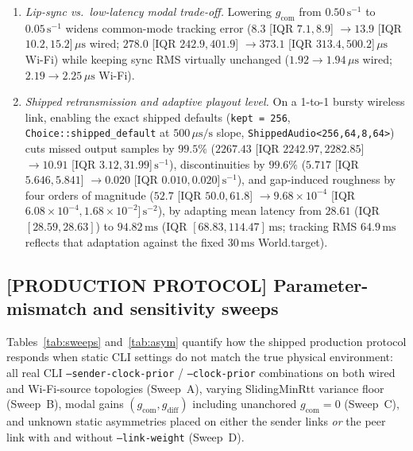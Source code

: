 \documentclass[11pt,a4paper]{article}
\DeclareRobustCommand{\lean}[1]{{\ttfamily\def\_{\textunderscore\allowbreak}#1}}
\theoremstyle{definition}
\begin{document}
\begin{enumerate}
  $7.72, 17.59$]\,$\mu\text{s}$), peak spread by $4.1\times$ ($154.6$ [IQR
  $143.5, 161.9$] $\to 37.4$ [IQR $30.2, 60.4$]\,$\mu\text{s}$), and tracking
  error by $2.7\times$ ($43.4$ [IQR $37.9, 49.7$] $\to 16.2$ [IQR
  $11.6, 19.6$]\,$\mu\text{s}$), while roughness and pause-induced misses stay
  comparable across both policies.
\item \emph{Lip-sync vs.\ low-latency modal trade-off.} Lowering
  $g_{\mathrm{com}}$ from $0.50\,\text{s}^{-1}$ to $0.05\,\text{s}^{-1}$ widens
  common-mode tracking error ($8.3$ [IQR $7.1, 8.9$] $\to 13.9$ [IQR
  $10.2, 15.2$]\,$\mu\text{s}$ wired; $278.0$ [IQR $242.9, 401.9$] $\to 373.1$
  [IQR $313.4, 500.2$]\,$\mu\text{s}$ Wi-Fi) while keeping sync RMS virtually
  unchanged ($1.92 \to 1.94\,\mu\text{s}$ wired; $2.19 \to 2.25\,\mu\text{s}$
  Wi-Fi).
\item \emph{Shipped retransmission and adaptive playout level.} On a 1-to-1
  bursty wireless link, enabling the exact shipped defaults
  (\texttt{kept = 256}, \texttt{Choice::shipped\_default} at
  $500\,\mu\text{s/s}$ slope, \texttt{ShippedAudio<256,64,8,64>}) cuts missed
  output samples by $99.5\%$ ($2267.43$ [IQR $2242.97, 2282.85$] $\to 10.91$
  [IQR $3.12, 31.99$]\,$\text{s}^{-1}$), discontinuities by $99.6\%$ ($5.717$
  [IQR $5.646, 5.841$] $\to 0.020$ [IQR $0.010, 0.020$]\,$\text{s}^{-1}$), and
  gap-induced roughness by four orders of magnitude ($52.7$ [IQR $50.0, 61.8$]
  $\to 9.68{\times}10^{-4}$ [IQR $6.08{\times}10^{-4}, 1.68{\times}10^{-2}$]\,$\text{s}^{-2}$),
  by adapting mean latency from $28.61$ (IQR $[28.59, 28.63]$) to $94.82\,\text{ms}$
  (IQR $[68.83, 114.47]\,\text{ms}$; tracking RMS $64.9\,\text{ms}$ reflects
  that adaptation against the fixed $30\,\text{ms}$ \lean{World.target}).
\end{enumerate}

\subsection{[PRODUCTION PROTOCOL] Parameter-mismatch and sensitivity sweeps}
\label{sec:sim-sweeps}

Tables~\ref{tab:sweeps} and~\ref{tab:asym} quantify how the shipped production
protocol responds when static CLI settings do not match the true physical
environment: all real CLI \texttt{--sender-clock-prior} /
\texttt{--clock-prior} combinations on both wired and Wi-Fi-source topologies
(Sweep~A), varying \lean{SlidingMinRtt} variance floor (Sweep~B), modal gains
$(g_{\mathrm{com}}, g_{\mathrm{diff}})$ including unanchored
$g_{\mathrm{com}} = 0$ (Sweep~C), and unknown static asymmetries placed on
either the sender links \emph{or} the peer link with and without
\texttt{--link-weight} (Sweep~D).
\end{document}
